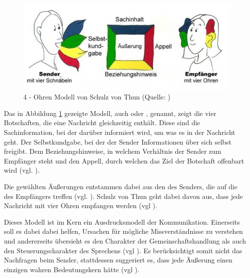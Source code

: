 \begin{figure}[ht]
\centering
\includegraphics[width=1\linewidth]{content/pictures/Kommunikationsquadrat.PNG}
\caption{4 - Ohren Modell von Schulz von Thun (Quelle: \cite{noauthor_kommunikationsquadrat_nodate})}
\label{fig:four-ears}
\end{figure}

Das in Abbildung \ref{fig:four-ears} gezeigte Modell, auch  oder , genannt, zeigt die vier Botschaften, die eine Nachricht gleichzeitig enthält. Diese sind die Sachinformation, bei der darüber informiert wird, um was es in der Nachricht geht. Der Selbstkundgabe, bei der der Sender Informationen über sich selbst freigibt. Dem Beziehungshinweise, in welchem Verhältnis der Sender zum Empfänger steht und den Appell, durch welchen das Ziel der Botschaft offenbart wird (vgl. \cite{noauthor_kommunikationsquadrat_nodate}).

Die gewählten Äußerungen entstammen dabei aus den  des Senders, die auf die  des Empfängers treffen (vgl. \cite{noauthor_kommunikationsquadrat_nodate}). Schulz von Thun geht dabei davon aus, dass jede Nachricht mit vier Ohren empfangen werden (vgl \cite[S. 23]{becker_praxishandbuch_2018}). 

Dieses Modell ist im Kern ein Ausdrucksmodell der Kommunikation. Einerseits soll es dabei dabei helfen, Ursachen für mögliche Missverständnisse zu verstehen und andererseits übersieht es den Charakter der Gemeinschaftshandlung als auch den Steuerungscharakter des Sprechens (vgl \cite[S. 23]{becker_praxishandbuch_2018}). Es berücksichtigt somit nicht das Nachfragen beim Sender, stattdessen suggeriert es, dass jede Äußerung einen einzigen wahren Bedeutungskern hätte (vgl \cite[S. 23]{becker_praxishandbuch_2018}). 

